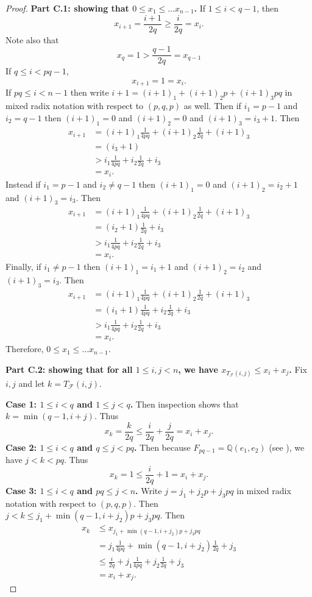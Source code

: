 \documentclass[letterpaper,10pt]{amsart}
\newcommand{\QQ}{\mathbb{Q}}      %
\newcommand{\cF}{\mathcal{F}}
\theoremstyle{definition}
\theoremstyle{remark}
\begin{document}
\begin{proof}
\noindent \textbf{Part C.1: showing that $0 \leq x_1 \leq \dots x_{n-1}$.}
If $1\leq i < q-1$, then
\[
	x_{i+1} = \frac{i+1}{2q} \geq \frac{i}{2q} = x_i.
\]
Note also that
\[
	x_q = 1 > \frac{q-1}{2q} = x_{q-1}
\]
If $q\leq i < pq-1$, 
\[
	x_{i+1} = 1 = x_i.
\]
If $pq\leq i < n-1$ then write $i+1 = (i+1)_1 + (i+1)_2p + (i+1)_3pq$ in mixed radix notation with respect to $(p,q,p)$ as well. Then if $i_1 = p-1$ and $i_2 = q-1$ then $(i+1)_1 = 0$ and $(i+1)_2 = 0$ and $(i+1)_3 = i_3 + 1$. Then
\begin{align*}
x_{i+1} &= (i+1)_1 \frac{1}{4pq} + (i+1)_2 \frac{1}{2q} + (i+1)_3 \\
&= (i_3 + 1) \\
& > i_1 \frac{1}{4pq} + i_2 \frac{1}{2q} + i_3 \\
&= x_i.
\end{align*}
Instead if $i_1 = p-1$ and $i_2 \neq q-1$ then $(i+1)_1 = 0$ and $(i+1)_2 = i_2 + 1$ and $(i+1)_3 = i_3$. Then
\begin{align*}
x_{i+1} &= (i+1)_1 \frac{1}{4pq} + (i+1)_2 \frac{1}{2q} + (i+1)_3 \\
&= (i_2+1) \frac{1}{2q} + i_3 \\
&> i_1 \frac{1}{4pq} + i_2 \frac{1}{2q} + i_3 \\
&= x_i.
\end{align*}
Finally, if $i_1 \neq p-1$ then $(i+1)_1 = i_1+1$ and $(i+1)_2 = i_2$ and $(i+1)_3 = i_3$. Then
\begin{align*}
x_{i+1} &= (i+1)_1 \frac{1}{4pq} + (i+1)_2 \frac{1}{2q} + (i+1)_3 \\
&= (i_1+1) \frac{1}{4pq} + i_2\frac{1}{2q} + i_3 \\
&> i_1 \frac{1}{4pq} + i_2 \frac{1}{2q} + i_3 \\
&= x_i.
\end{align*}
Therefore, $0 \leq x_1 \leq \dots x_{n-1}$. 

\noindent \textbf{Part C.2: showing that for all $1\leq i,j < n$, we have $x_{T_{\cF}(i,j)} \leq x_i + x_j$.}
Fix $i,j$ and let $k = T_{\cF}(i,j)$.

\noindent \textbf{Case 1: $1 \leq i < q$ and $1 \leq j < q$.}
Then inspection shows that $k = \min(q-1, i+j)$. Thus
\[
	x_k = \frac{k}{2q} \leq \frac{i}{2q} + \frac{j}{2q} = x_i + x_j.
\]
\noindent \textbf{Case 2: $1 \leq i < q$ and $q \leq j < pq$.}
Then because $F_{pq-1} = \QQ(e_1,e_2)$ (see ), we have $j < k < pq$. Thus
\[
	x_k = 1 \leq \frac{i}{2q} + 1 = x_i + x_j.
\]
\noindent \textbf{Case 3: $1 \leq i < q$ and $pq \leq j < n$.}
Write $j = j_1 + j_2p + j_3pq$ in mixed radix notation with respect to $(p,q,p)$. Then $j < k \leq j_1 + \min(q-1,i+j_2)p + j_3pq$. Then
\begin{align*}
x_k &\leq x_{j_1 + \min(q-1,i+j_2)p + j_3pq} \\
&= j_1 \frac{1}{4pq} + \min(q-1,i+j_2) \frac{1}{2q} + j_3 \\
&\leq \frac{i}{2q} + j_1 \frac{1}{4pq} + j_2 \frac{1}{2q} + j_3 \\
&= x_i + x_j.
\end{align*}


\end{proof}
\end{document}
